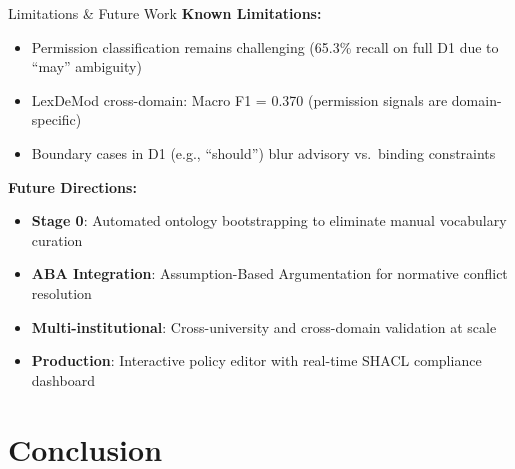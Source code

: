 \documentclass[aspectratio=169, 10pt]{beamer}
\begin{document}
\begin{frame}{Limitations \& Future Work}
    \textbf{Known Limitations:}
    \begin{itemize}
        \item Permission classification remains challenging (65.3\% recall on full D1 due to ``may'' ambiguity)
        \item LexDeMod cross-domain: Macro F1 = 0.370 (permission signals are domain-specific)
        \item Boundary cases in D1 (e.g., ``should'') blur advisory vs.\ binding constraints
    \end{itemize}
    
    \vspace{0.3cm}
    \textbf{Future Directions:}
    \begin{itemize}
        \item \textbf{Stage 0}: Automated ontology bootstrapping to eliminate manual vocabulary curation
        \item \textbf{ABA Integration}: Assumption-Based Argumentation for normative conflict resolution
        \item \textbf{Multi-institutional}: Cross-university and cross-domain validation at scale
        \item \textbf{Production}: Interactive policy editor with real-time SHACL compliance dashboard
    \end{itemize}
\end{frame}

\section{Conclusion}
\end{document}
